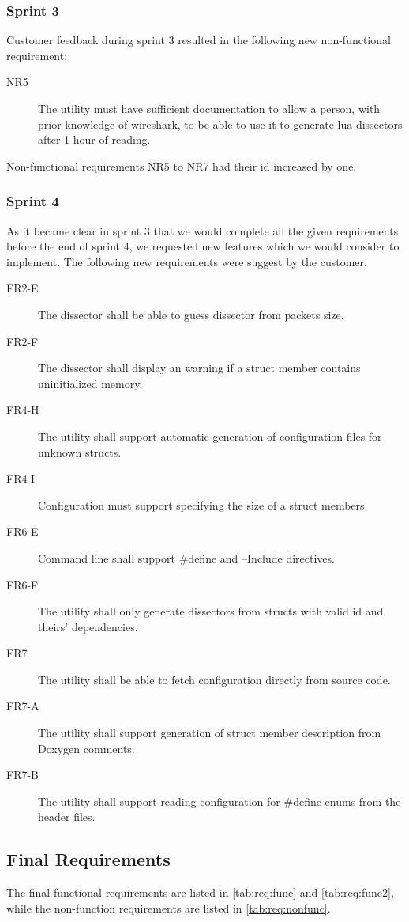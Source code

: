 \subsubsection{Sprint 3}
Customer feedback during sprint 3 resulted in the following new non-functional requirement:
\begin{description}
	\item[NR5] The \gls{utility} must have sufficient documentation to allow a person, with prior knowledge of \Gls{wireshark}, to be able to use it to generate \Gls{lua} \glspl{dissector} after 1 hour of reading.
\end{description}
Non-functional requirements NR5 to NR7 had their id increased by one.

\subsubsection{Sprint 4}
As it became clear in sprint 3 that we would complete all the given
requirements before the end of sprint 4, we requested new features which we
would consider to implement. The following new requirements were suggest by
the customer.
\begin{description}
	\item[FR2-E] The \gls{dissector} shall be able to guess dissector from packets size.
	\item[FR2-F] The \gls{dissector} shall display an warning if a struct member contains uninitialized memory.
	\item[FR4-H] The utility shall support automatic generation of configuration files for unknown structs.
	\item[FR4-I] Configuration must support specifying the size of a struct members.
	\item[FR6-E] Command line shall support \#define and --Include directives.
	\item[FR6-F] The utility shall only generate dissectors from structs with valid id and theirs' dependencies.
	\item[FR7] The utility shall be able to fetch configuration directly from source code.
	\item[FR7-A] The utility shall support generation of struct member description from Doxygen comments.
	\item[FR7-B] The utility shall support reading configuration for \#define enums from the header files.
\end{description}

\subsection{Final Requirements}
\label{sec:req:finalreq}
The final functional requirements are listed in \autoref{tab:req:func} and 
\autoref{tab:req:func2}, while the non-function requirements are listed in
\autoref{tab:req:nonfunc}.

